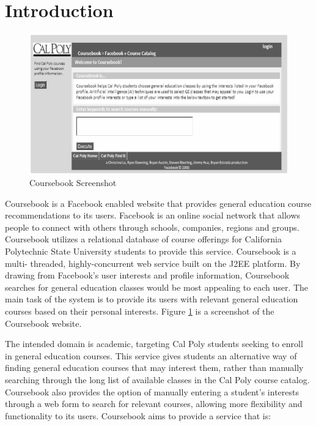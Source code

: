 \section{Introduction}

\begin{figure}[t]
  \begin{center}
  \includegraphics[scale=0.75]{images/screenshot}
  \caption{Coursebook Screenshot}
  \label{fig:screenshot}
  \end{center}
\end{figure}

Coursebook is a Facebook enabled website that provides general education course
recommendations to its users. Facebook is an online social network that allows
people to connect with others through schools, companies, regions and groups.
Coursebook utilizes a relational database of course offerings for California 
Polytechnic State University students to provide this service. Coursebook is a multi-
threaded, highly-concurrent web service built on the J2EE platform. By drawing 
from Facebook's user interests and profile information, Coursebook searches for 
general education classes would be most appealing to each user. The main task of 
the system is to provide its users with relevant general education courses based on 
their personal interests. Figure \ref{fig:screenshot} is a screenshot of the
Coursebook website.

The intended domain is academic, targeting Cal Poly students seeking to enroll 
in general education courses. This service gives students an alternative way of 
finding general education courses that may interest them, rather than manually 
searching through the long list of available classes in the Cal Poly course catalog. 
Coursebook also provides the option of manually entering a student's interests 
through a web form to search for relevant courses, allowing more flexibility and 
functionality to its users. Coursebook aims to provide a service that is:

